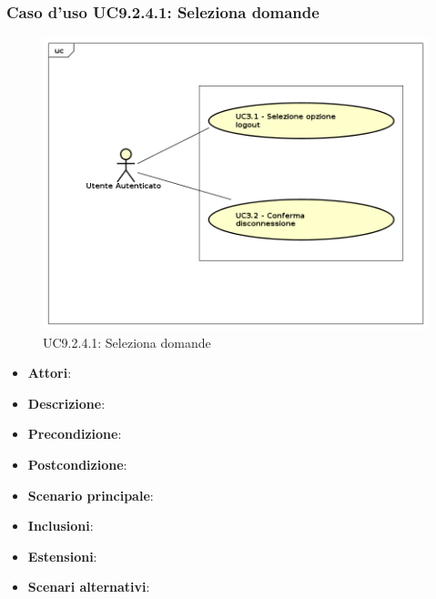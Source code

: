 			\subsubsection{Caso d'uso UC9.2.4.1: Seleziona domande}	
			\label{UC9.2.4.1}
			\begin{figure}[h]
				\centering
			\includegraphics[scale=0.7,keepaspectratio]{UML/UC9.png}
				\caption{UC9.2.4.1: Seleziona domande}
			\end{figure}
			\FloatBarrier
			\begin{itemize}
				\item \textbf{Attori}: 
				\item \textbf{Descrizione}: 
				\item \textbf{Precondizione}: 
				\item \textbf{Postcondizione}: 
				\item \textbf{Scenario principale}:
				\item \textbf{Inclusioni}:
				\item \textbf{Estensioni}:
				\item \textbf{Scenari alternativi}:
			\end{itemize}
			
